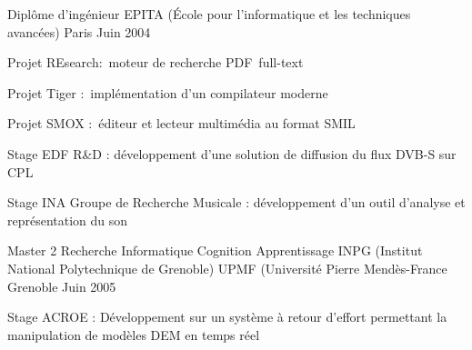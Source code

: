 

\begin{cventries}

  \cventry
    {Diplôme d'ingénieur} %
    {EPITA (École pour l'informatique et les techniques avancées)} %
    {Paris} %
    {Juin 2004} %
    {
      \begin{cvitems} %
        \item {Projet REsearch: moteur de recherche PDF full-text}
        \item {Projet Tiger : implémentation d'un compilateur moderne}
        \item {Projet SMOX : éditeur et lecteur multimédia au format SMIL}
        \item {Stage EDF R\&D : développement d'une solution de diffusion du flux DVB-S sur CPL}
        \item {Stage INA Groupe de Recherche Musicale : développement d'un outil d’analyse et représentation du son}
      \end{cvitems}
    }

  \cventry
    {Master 2 Recherche Informatique Cognition Apprentissage} %
    {INPG (Institut National Polytechnique de Grenoble) \linebreak UPMF (Université Pierre Mendès-France} %
    {Grenoble} %
    {Juin 2005} %
    {
      \begin{cvitems} %
        \item {Stage ACROE : Développement sur un système à retour d'effort permettant la manipulation de modèles DEM en temps réel}
      \end{cvitems}
    }

\end{cventries}

